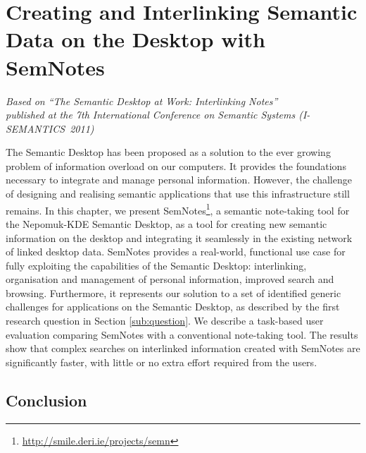 \chapter
{Creating and Interlinking Semantic Data on the Desktop with SemNotes}
\label{ch:semnotes}

\begin{flushright}
 \textit{Based on ``The Semantic Desktop at Work: Interlinking Notes'' \cite{Dragan2011a}\\published at the 7th International Conference on Semantic Systems (I-SEMANTICS~2011)}
\end{flushright}

The Semantic Desktop has been proposed as a solution to the ever growing problem of information overload on our computers. It provides the foundations necessary to integrate and manage personal information. However, the challenge of designing and realising semantic applications that use this infrastructure still remains. 
In this chapter, we present SemNotes\footnote{\url{http://smile.deri.ie/projects/semn}}, a semantic note-taking tool for the Nepomuk-KDE Semantic Desktop, as a tool for creating new semantic information on the desktop and integrating it seamlessly in the existing network of linked desktop data.
SemNotes provides a real-world, functional use case for fully exploiting the capabilities of the Semantic Desktop: interlinking, organisation and management of personal information, improved search and browsing. 
Furthermore, it represents our solution to a set of identified generic challenges for applications on the Semantic Desktop, as described by the first research question in Section \ref{sub:question}.
We describe a task-based user evaluation comparing SemNotes with a conventional note-taking tool. The results show that complex searches on interlinked information created with SemNotes are significantly faster, with little or no extra effort required from the users. 











\section{Conclusion}

